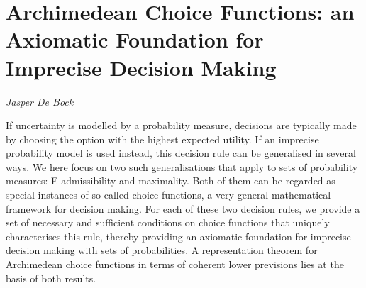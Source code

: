 \documentclass[../booklet.tex]{subfiles}
\begin{document}
\section[Archimedean Choice Functions: an Axiomatic Foundation for Imprecise Decision Making. {\it Jasper De Bock}]{Archimedean Choice Functions: an Axiomatic Foundation for Imprecise Decision Making}

\begin{center}
  {\it Jasper De Bock}
\end{center}

\vskip 0.8cm


If uncertainty is modelled by a probability measure, decisions are typically made by choosing the option with the highest expected utility. If an imprecise probability model is used instead, this decision rule can be generalised in several ways. We here focus on two such generalisations that apply to sets of probability measures: E-admissibility and maximality. Both of them can be regarded as special instances of so-called choice functions, a very general mathematical framework for decision making. For each of these two decision rules, we provide a set of necessary and sufficient conditions on choice functions that uniquely characterises this rule, thereby providing an axiomatic foundation for imprecise decision making with sets of probabilities. A representation theorem for Archimedean choice functions in terms of coherent lower previsions lies at the basis of both results.

\end{document}
